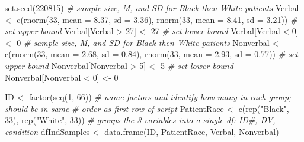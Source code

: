 \documentclass[
  11pt,
]{book}
\newenvironment{Shaded}{\begin{snugshade}}{\end{snugshade}}
\newcommand{\AttributeTok}[1]{\textcolor[rgb]{0.77,0.63,0.00}{#1}}
\newcommand{\CommentTok}[1]{\textcolor[rgb]{0.56,0.35,0.01}{\textit{#1}}}
\newcommand{\DecValTok}[1]{\textcolor[rgb]{0.00,0.00,0.81}{#1}}
\newcommand{\FloatTok}[1]{\textcolor[rgb]{0.00,0.00,0.81}{#1}}
\newcommand{\FunctionTok}[1]{\textcolor[rgb]{0.00,0.00,0.00}{#1}}
\newcommand{\NormalTok}[1]{#1}
\newcommand{\OtherTok}[1]{\textcolor[rgb]{0.56,0.35,0.01}{#1}}
\newcommand{\SpecialCharTok}[1]{\textcolor[rgb]{0.00,0.00,0.00}{#1}}
\newcommand{\StringTok}[1]{\textcolor[rgb]{0.31,0.60,0.02}{#1}}
\begin{document}
\begin{Shaded}
\begin{Highlighting}[]
\FunctionTok{set.seed}\NormalTok{(}\DecValTok{220815}\NormalTok{)}
\CommentTok{\# sample size, M, and SD for Black then White patients}
\NormalTok{Verbal }\OtherTok{\textless{}{-}} \FunctionTok{c}\NormalTok{(}\FunctionTok{rnorm}\NormalTok{(}\DecValTok{33}\NormalTok{, }\AttributeTok{mean =} \FloatTok{8.37}\NormalTok{, }\AttributeTok{sd =} \FloatTok{3.36}\NormalTok{), }\FunctionTok{rnorm}\NormalTok{(}\DecValTok{33}\NormalTok{, }\AttributeTok{mean =} \FloatTok{8.41}\NormalTok{, }\AttributeTok{sd =} \FloatTok{3.21}\NormalTok{))}
\CommentTok{\# set upper bound}
\NormalTok{Verbal[Verbal }\SpecialCharTok{\textgreater{}} \DecValTok{27}\NormalTok{] }\OtherTok{\textless{}{-}} \DecValTok{27}
\CommentTok{\# set lower bound}
\NormalTok{Verbal[Verbal }\SpecialCharTok{\textless{}} \DecValTok{0}\NormalTok{] }\OtherTok{\textless{}{-}} \DecValTok{0}
\CommentTok{\# sample size, M, and SD for Black then White patients}
\NormalTok{Nonverbal }\OtherTok{\textless{}{-}} \FunctionTok{c}\NormalTok{(}\FunctionTok{rnorm}\NormalTok{(}\DecValTok{33}\NormalTok{, }\AttributeTok{mean =} \FloatTok{2.68}\NormalTok{, }\AttributeTok{sd =} \FloatTok{0.84}\NormalTok{), }\FunctionTok{rnorm}\NormalTok{(}\DecValTok{33}\NormalTok{, }\AttributeTok{mean =} \FloatTok{2.93}\NormalTok{,}
    \AttributeTok{sd =} \FloatTok{0.77}\NormalTok{))}
\CommentTok{\# set upper bound}
\NormalTok{Nonverbal[Nonverbal }\SpecialCharTok{\textgreater{}} \DecValTok{5}\NormalTok{] }\OtherTok{\textless{}{-}} \DecValTok{5}
\CommentTok{\# set lower bound}
\NormalTok{Nonverbal[Nonverbal }\SpecialCharTok{\textless{}} \DecValTok{0}\NormalTok{] }\OtherTok{\textless{}{-}} \DecValTok{0}

\NormalTok{ID }\OtherTok{\textless{}{-}} \FunctionTok{factor}\NormalTok{(}\FunctionTok{seq}\NormalTok{(}\DecValTok{1}\NormalTok{, }\DecValTok{66}\NormalTok{))}
\CommentTok{\# name factors and identify how many in each group; should be in same}
\CommentTok{\# order as first row of script}
\NormalTok{PatientRace }\OtherTok{\textless{}{-}} \FunctionTok{c}\NormalTok{(}\FunctionTok{rep}\NormalTok{(}\StringTok{"Black"}\NormalTok{, }\DecValTok{33}\NormalTok{), }\FunctionTok{rep}\NormalTok{(}\StringTok{"White"}\NormalTok{, }\DecValTok{33}\NormalTok{))}
\CommentTok{\# groups the 3 variables into a single df: ID\#, DV, condition}
\NormalTok{dfIndSamples }\OtherTok{\textless{}{-}} \FunctionTok{data.frame}\NormalTok{(ID, PatientRace, Verbal, Nonverbal)}
\end{Highlighting}
\end{Shaded}
\end{document}
